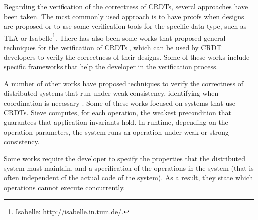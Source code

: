 \documentclass[12pt]{article}
\begin{document}
Regarding the verification of the correctness of CRDTs, several approaches have been 
taken. The most commonly used approach is to have proofs when designs are proposed
or to use some verification tools for the specific data type, such as 
TLA \cite{Lamport94TLA} or Isabelle\footnote{Isabelle: \url{http://isabelle.in.tum.de/}.}.
There has also been some works that proposed general techniques 
for the verification of CRDTs \cite{Burckhardt14Replicated,Zeller14Formal,Gomes17Verifying}, 
which can be used by CRDT developers to verify the correctness of their designs.
Some of these works \cite{Zeller14Formal,Gomes17Verifying} 
include specific frameworks that help the developer 
in the verification process.

A number of other works have proposed techniques to verify the correctness
of distributed systems that run under weak consistency, identifying when
coordination is necessary 
\cite{Li14Automating,Balegas15Putting,Homeostasis,Gotsman16Cause,Zeller17Testing,blazes}.
Some of these works focused on systems that use CRDTs.
Sieve \cite{Li14Automating} computes, for each operation, the weakest precondition 
that guarantees that application invariants hold. 
In runtime, depending on the operation parameters, the system runs an operation under
weak or strong consistency.

Some works \cite{Balegas15Putting,Gotsman16Cause,Zeller17Testing} require the developer 
to specify the properties that the distributed system must maintain, and a 
specification of the operations in the system (that is often independent 
of the actual code of the system). 
As a result, they state which operations cannot execute concurrently.

\end{document}
